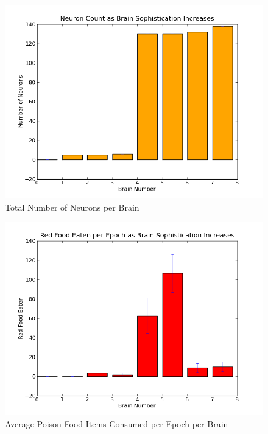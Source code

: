 \documentclass[a4paper,11pt]{article}
\begin{document}
\begin{figure}
\begin{center}
  \includegraphics[scale=1.0]{img/neuronBar-0.0-0.0-0.0-0.0-0.0-0.0-0.0-0.0.png}
  \caption{Total Number of Neurons per Brain }
  \label{fig:neuronbar}
\end{center}
\end{figure}

\begin{figure}
\begin{center}
  \includegraphics[scale=1.0]{img/redBar-0.0-0.0-4.0-2.23-18.21-19.44-4.58-4.97.png}
  \caption{Average Poison Food Items Consumed per Epoch per Brain  }
  \label{fig:redbar}
\end{center}
\end{figure}
\end{document}
